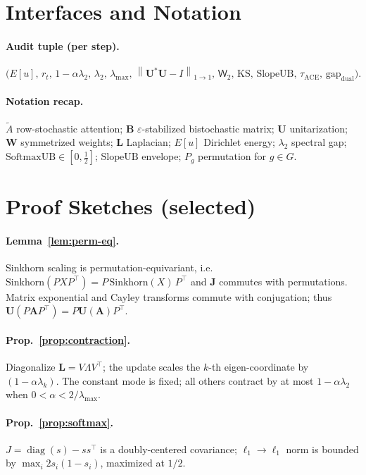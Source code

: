 \documentclass[11pt]{article}
\newcommand{\Id}{I}
\newcommand{\diag}{\operatorname{diag}}
\newcommand{\norm}[1]{\left\lVert #1 \right\rVert}
\newcommand{\W}{\mathsf{W}}
\newcommand{\bJ}{\mathbf{J}}
\newcommand{\bA}{\mathbf{A}}
\newcommand{\bB}{\mathbf{B}}
\newcommand{\bU}{\mathbf{U}}
\newcommand{\bL}{\mathbf{L}}
\newcommand{\bW}{\mathbf{W}}
\begin{document}
\section{Interfaces and Notation}
\paragraph{Audit tuple (per step).} 
\[
\big(E[u],\, r_t,\, 1-\alpha\lambda_2,\, \lambda_2,\, \lambda_{\max},\, \norm{\bU^*\bU-\Id}_{1\to 1},\, \W_2,\, \mathrm{KS},\, \mathrm{SlopeUB},\, \tau_{\mathrm{ACE}},\, \mathrm{gap}_{\mathrm{dual}}\big).
\]

\paragraph{Notation recap.}
$\tilde A$ row-stochastic attention; $\bB$ $\varepsilon$-stabilized bistochastic matrix; $\bU$ unitarization; $\bW$ symmetrized weights; $\bL$ Laplacian; $E[u]$ Dirichlet energy; $\lambda_2$ spectral gap; $\mathrm{SoftmaxUB}\in[0,\tfrac12]$; $\mathrm{SlopeUB}$ envelope; $P_g$ permutation for $g\in G$.

\section{Proof Sketches (selected)}
\paragraph{Lemma~\ref{lem:perm-eq}.}
Sinkhorn scaling is permutation-equivariant, i.e.\ $\mathrm{Sinkhorn}(P X P^\top)=P\,\mathrm{Sinkhorn}(X)\,P^\top$ and $\bJ$ commutes with permutations. Matrix exponential and Cayley transforms commute with conjugation; thus $\bU(P\bA P^\top)=P\bU(\bA)P^\top$.

\paragraph{Prop.~\ref{prop:contraction}.}
Diagonalize $\bL=V\Lambda V^\top$; the update scales the $k$-th eigen-coordinate by $(1-\alpha\lambda_k)$. The constant mode is fixed; all others contract by at most $1-\alpha\lambda_2$ when $0<\alpha<2/\lambda_{\max}$.

\paragraph{Prop.~\ref{prop:softmax}.}
$J=\diag(s)-ss^\top$ is a doubly-centered covariance; $\ell_1\to \ell_1$ norm is bounded by $\max_i 2s_i(1-s_i)$, maximized at $1/2$.
\end{document}
